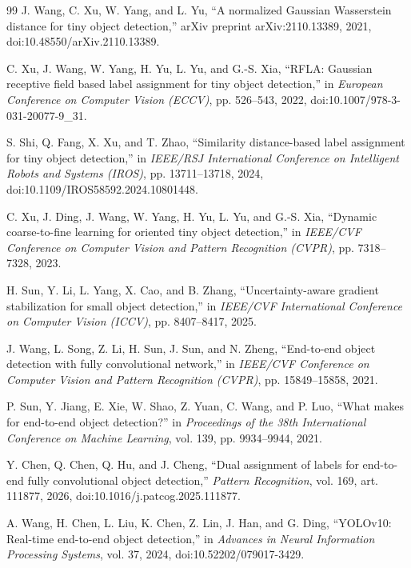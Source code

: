 \begin{thebibliography}{99}
J. Wang, C. Xu, W. Yang, and L. Yu,
``A normalized Gaussian Wasserstein distance for tiny object detection,''
arXiv preprint arXiv:2110.13389, 2021,
doi:10.48550/arXiv.2110.13389.

C. Xu, J. Wang, W. Yang, H. Yu, L. Yu, and G.-S. Xia,
``RFLA: Gaussian receptive field based label assignment for tiny object detection,''
in \emph{European Conference on Computer Vision (ECCV)}, pp. 526--543, 2022,
doi:10.1007/978-3-031-20077-9\_31.

S. Shi, Q. Fang, X. Xu, and T. Zhao,
``Similarity distance-based label assignment for tiny object detection,''
in \emph{IEEE/RSJ International Conference on Intelligent Robots and Systems (IROS)},
pp. 13711--13718, 2024, doi:10.1109/IROS58592.2024.10801448.

C. Xu, J. Ding, J. Wang, W. Yang, H. Yu, L. Yu, and G.-S. Xia,
``Dynamic coarse-to-fine learning for oriented tiny object detection,''
in \emph{IEEE/CVF Conference on Computer Vision and Pattern Recognition (CVPR)},
pp. 7318--7328, 2023.

H. Sun, Y. Li, L. Yang, X. Cao, and B. Zhang,
``Uncertainty-aware gradient stabilization for small object detection,''
in \emph{IEEE/CVF International Conference on Computer Vision (ICCV)},
pp. 8407--8417, 2025.

J. Wang, L. Song, Z. Li, H. Sun, J. Sun, and N. Zheng,
``End-to-end object detection with fully convolutional network,''
in \emph{IEEE/CVF Conference on Computer Vision and Pattern Recognition (CVPR)},
pp. 15849--15858, 2021.

P. Sun, Y. Jiang, E. Xie, W. Shao, Z. Yuan, C. Wang, and P. Luo,
``What makes for end-to-end object detection?''
in \emph{Proceedings of the 38th International Conference on Machine Learning},
vol. 139, pp. 9934--9944, 2021.

Y. Chen, Q. Chen, Q. Hu, and J. Cheng,
``Dual assignment of labels for end-to-end fully convolutional object detection,''
\emph{Pattern Recognition}, vol. 169, art. 111877, 2026,
doi:10.1016/j.patcog.2025.111877.

A. Wang, H. Chen, L. Liu, K. Chen, Z. Lin, J. Han, and G. Ding,
``YOLOv10: Real-time end-to-end object detection,''
in \emph{Advances in Neural Information Processing Systems}, vol. 37, 2024,
doi:10.52202/079017-3429.


\end{thebibliography}
